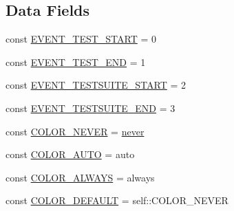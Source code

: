 \subsection*{Data Fields}
\begin{DoxyCompactItemize}
\item 
const \mbox{\hyperlink{class_p_h_p_unit___text_u_i___result_printer_a220b6910c1dd93908bdf934788cbd02c}{E\+V\+E\+N\+T\+\_\+\+T\+E\+S\+T\+\_\+\+S\+T\+A\+RT}} = 0
\item 
const \mbox{\hyperlink{class_p_h_p_unit___text_u_i___result_printer_a88a8e66608e397ea5bcec346b4832afb}{E\+V\+E\+N\+T\+\_\+\+T\+E\+S\+T\+\_\+\+E\+ND}} = 1
\item 
const \mbox{\hyperlink{class_p_h_p_unit___text_u_i___result_printer_a54b0407348ba93a2142896cfcab9ae8c}{E\+V\+E\+N\+T\+\_\+\+T\+E\+S\+T\+S\+U\+I\+T\+E\+\_\+\+S\+T\+A\+RT}} = 2
\item 
const \mbox{\hyperlink{class_p_h_p_unit___text_u_i___result_printer_aabaf257d9cc55646e409453097a81523}{E\+V\+E\+N\+T\+\_\+\+T\+E\+S\+T\+S\+U\+I\+T\+E\+\_\+\+E\+ND}} = 3
\item 
const \mbox{\hyperlink{class_p_h_p_unit___text_u_i___result_printer_a91232fac6fcbc91e34950220aa4f9d2e}{C\+O\+L\+O\+R\+\_\+\+N\+E\+V\+ER}} = \textquotesingle{}\mbox{\hyperlink{_functions_8php_a5f3c11b90fed1f1f1cd123af8f802285}{never}}\textquotesingle{}
\item 
const \mbox{\hyperlink{class_p_h_p_unit___text_u_i___result_printer_a04f9b419c55dfed29e86a49094316c18}{C\+O\+L\+O\+R\+\_\+\+A\+U\+TO}} = \textquotesingle{}auto\textquotesingle{}
\item 
const \mbox{\hyperlink{class_p_h_p_unit___text_u_i___result_printer_ac41b9afdb2cca18c7fbb77acbc0ff669}{C\+O\+L\+O\+R\+\_\+\+A\+L\+W\+A\+YS}} = \textquotesingle{}always\textquotesingle{}
\item 
const \mbox{\hyperlink{class_p_h_p_unit___text_u_i___result_printer_aca50b620904dd80bc667c1613759fe0d}{C\+O\+L\+O\+R\+\_\+\+D\+E\+F\+A\+U\+LT}} = self\+::\+C\+O\+L\+O\+R\+\_\+\+N\+E\+V\+ER
\end{DoxyCompactItemize}
